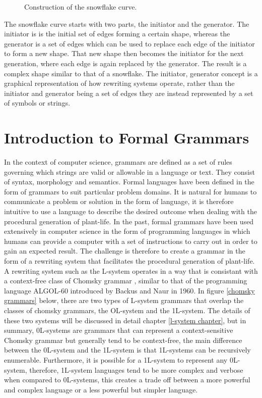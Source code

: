 \begin{figure}[htbp]
	{\centering
		\setlength{\fboxrule}{1pt}
		\vspace{7px}
		\caption{Construction of the snowflake curve\cite{prusinkiewicz2013lindenmayer}.} \label{snowflake curve}
	}
\end{figure}
\FloatBarrier

\noindent
The snowflake curve starts with two parts, the initiator and the generator. The initiator is is the initial set of edges forming a certain shape, whereas the generator is a set of edges which can be used to replace each edge of the initiator to form a new shape. That new shape then becomes the initiator for the next generation, where each edge is again replaced by the generator. The result is a complex shape similar to that of a snowflake. The initiator, generator concept is a graphical representation of how rewriting systems operate, rather than the initiator and generator being a set of edges they are instead represented by a set of symbols or strings.

\section{Introduction to Formal Grammars}

In the context of computer science, grammars are defined as a set of rules governing which strings are valid or allowable in a language or text. They consist of syntax, morphology and semantics. Formal languages have been defined in the form of grammars to suit particular problem domains. It is natural for humans to communicate a problem or solution in the form of language, it is therefore intuitive to use a language to describe the desired outcome when dealing with the procedural generation of plant-life. In the past, formal grammars have been used extensively in computer science in the form of programming languages in which humans can provide a computer with a set of instructions to carry out in order to gain an expected result. The challenge is therefore to create a  grammar in the form of a rewriting system that facilitates the procedural generation of plant-life. A rewriting system such as the L-system operates in a way that is consistant with a context-free class of Chomsky grammar \cite{chomsky1956three}, similar to that of the programming language ALGOL-60 introduced by Backus and Naur in  1960\cite{backus1960report}. In figure \ref{chomsky grammars} below, there are two types of L-system grammars that overlap the classes of chomsky grammars, the OL-system and the 1L-system. The details of these two systems will be discussed in detail chapter \ref{l-system chapter}, but in summary, 0L-systems are grammars that can represent a context-sensitive Chomsky grammar but generally tend to be context-free, the main difference between the 0L-system and the 1L-system is that 1L-systems can be recursively enumerable. Furthermore, it is possible for a 1L-system to represent any 0L-system, therefore, 1L-system languages tend to be more complex and verbose when compared to 0L-systems, this creates a trade off between a more powerful and complex language or a less powerful but simpler language. 

